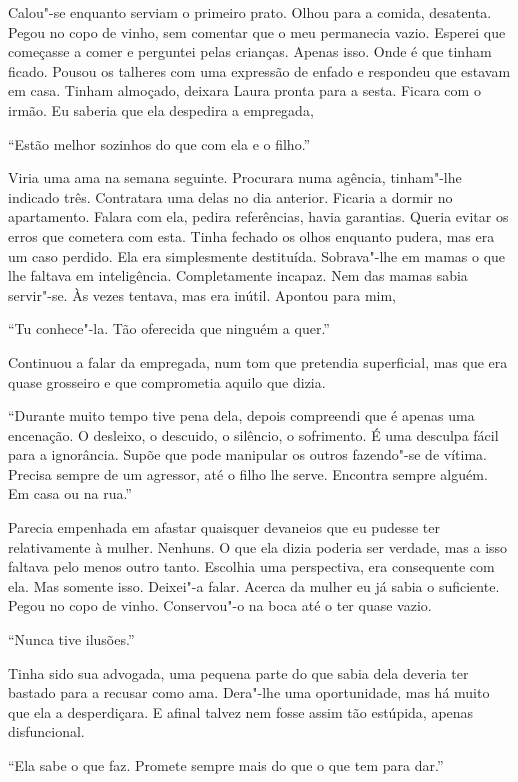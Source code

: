 Calou"-se enquanto serviam o primeiro prato. Olhou para a comida,
desatenta. Pegou no copo de vinho, sem comentar que o meu permanecia
vazio. Esperei que começasse a comer e perguntei pelas crianças. Apenas
isso. Onde é que tinham ficado. Pousou os talheres com uma expressão de
enfado e respondeu que estavam em casa. Tinham almoçado, deixara Laura
pronta para a sesta. Ficara com o irmão. Eu saberia que ela despedira a
empregada,

``Estão melhor sozinhos do que com ela e o filho.''

Viria uma ama na semana seguinte. Procurara numa agência, tinham"-lhe
indicado três. Contratara uma delas no dia anterior. Ficaria a dormir no
apartamento. Falara com ela, pedira referências, havia garantias. Queria
evitar os erros que cometera com esta. Tinha fechado os olhos enquanto
pudera, mas era um caso perdido. Ela era simplesmente destituída.
Sobrava"-lhe em mamas o que lhe faltava em inteligência. Completamente
incapaz. Nem das mamas sabia servir"-se. Às vezes tentava, mas era
inútil. Apontou para mim,

``Tu conhece"-la. Tão oferecida que ninguém a quer.''

Continuou a falar da empregada, num tom que pretendia superficial, mas
que era quase grosseiro e que comprometia aquilo que dizia.

``Durante muito tempo tive pena dela, depois compreendi que é apenas uma
encenação. O desleixo, o descuido, o silêncio, o sofrimento. É uma
desculpa fácil para a ignorância. Supõe que pode manipular os outros
fazendo"-se de vítima. Precisa sempre de um agressor, até o filho lhe
serve. Encontra sempre alguém. Em casa ou na rua.''

Parecia empenhada em afastar quaisquer devaneios que eu pudesse ter
relativamente à mulher. Nenhuns. O que ela dizia poderia ser verdade,
mas a isso faltava pelo menos outro tanto. Escolhia uma perspectiva, era
consequente com ela. Mas somente isso. Deixei"-a falar. Acerca da mulher
eu já sabia o suficiente. Pegou no copo de vinho. Conservou"-o na boca
até o ter quase vazio.

``Nunca tive ilusões.''

Tinha sido sua advogada, uma pequena parte do que sabia dela deveria ter
bastado para a recusar como ama. Dera"-lhe uma oportunidade, mas há
muito que ela a desperdiçara. E afinal talvez nem fosse assim tão
estúpida, apenas disfuncional.

``Ela sabe o que faz. Promete sempre mais do que o que tem para dar.''

